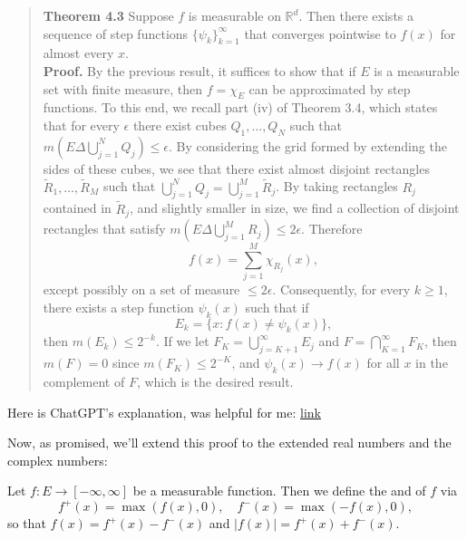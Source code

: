 \begin{quote}
    \textbf{Theorem 4.3} Suppose \( f \) is measurable on \( \mathbb{R}^d \). Then there exists a sequence of step functions \( \{\psi_k\}_{k=1}^{\infty} \) that converges pointwise to \( f(x) \) for almost every \( x \). \\
    \textbf{Proof.} By the previous result, it suffices to show that if \( E \) is a measurable set with finite measure, then \( f = \chi_E \) can be approximated by step functions. To this end, we recall part (iv) of Theorem 3.4, which states that for every \( \epsilon \) there exist cubes \( Q_1, \dots, Q_N \) such that \( m(E \Delta \bigcup_{j=1}^{N} Q_j) \leq \epsilon \). By considering the grid formed by extending the sides of these cubes, we see that there exist almost disjoint rectangles \( \tilde{R}_1, \dots, \tilde{R}_M \) such that \( \bigcup_{j=1}^{N} Q_j = \bigcup_{j=1}^{M} \tilde{R}_j \). By taking rectangles \( R_j \) contained in \( \tilde{R}_j \), and slightly smaller in size, we find a collection of disjoint rectangles that satisfy \( m(E \Delta \bigcup_{j=1}^{M} R_j) \leq 2\epsilon \). Therefore
    \[
    f(x) = \sum_{j=1}^{M} \chi_{R_j}(x),
    \]
    except possibly on a set of measure \( \leq 2\epsilon \). Consequently, for every \( k \geq 1 \), there exists a step function \( \psi_k(x) \) such that if 
    \[
    E_k = \{x : f(x) \neq \psi_k(x)\},
    \]
    then \( m(E_k) \leq 2^{-k} \). If we let \( F_K = \bigcup_{j=K+1}^{\infty} E_j \) and \( F = \bigcap_{K=1}^{\infty} F_K \), then \( m(F) = 0 \) since \( m(F_K) \leq 2^{-K} \), and \( \psi_k(x) \to f(x) \) for all \( x \) in the complement of \( F \), which is the desired result.
\end{quote}

Here is ChatGPT's explanation, was helpful for me: \href{https://chatgpt.com/share/6705442a-1f4c-8013-b47e-b9dfe4231cc4}{link}



Now, as promised, we'll extend this proof to the extended real numbers and the complex numbers:

\begin{definition}
Let $f: E \to [-\infty, \infty]$ be a measurable function. Then we define the  and  of $f$ via 
\[
    f^+(x) = \max(f(x), 0), \quad f^-(x) = \max(-f(x), 0),
\]
so that $f(x) = f^+(x) - f^-(x)$ and $|f(x)| = f^+(x) + f^-(x)$.
\end{definition}

